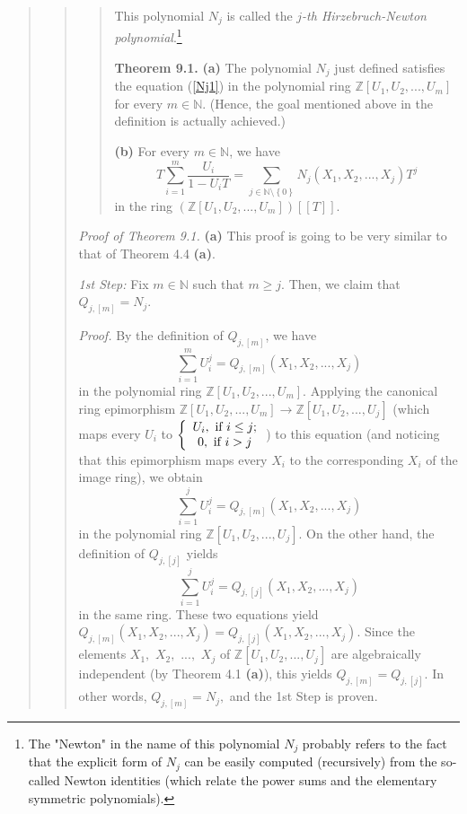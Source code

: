\documentclass[12pt,final,notitlepage,onecolumn,german]{article}%
\begin{document}
\begin{quote}
\begin{quote}
\begin{quote}
This polynomial $N_{j}$ is called the $j$\textit{-th Hirzebruch-Newton
polynomial}.\footnote{The "Newton" in the name of this polynomial $N_{j}$
probably refers to the fact that the explicit form of $N_{j}$ can be easily
computed (recursively) from the so-called Newton identities (which relate the
power sums and the elementary symmetric polynomials).}

\textbf{Theorem 9.1.} \textbf{(a)} The polynomial $N_{j}$ just defined
satisfies the equation (\ref{Nj1}) in the polynomial ring $\mathbb{Z}\left[
U_{1},U_{2},...,U_{m}\right]  $ for every $m\in\mathbb{N}$. (Hence, the goal
mentioned above in the definition is actually achieved.)

\textbf{(b)} For every $m\in\mathbb{N}$, we have%
\begin{equation}
T\sum_{i=1}^{m}\dfrac{U_{i}}{1-U_{i}T}=\sum_{j\in\mathbb{N}\setminus\left\{
0\right\}  }N_{j}\left(  X_{1},X_{2},...,X_{j}\right)  T^{j} \label{Nj2}%
\end{equation}
in the ring $\left(  \mathbb{Z}\left[  U_{1},U_{2},...,U_{m}\right]  \right)
\left[  \left[  T\right]  \right]  $.
\end{quote}

\textit{Proof of Theorem 9.1.} \textbf{(a)} This proof is going to be very
similar to that of Theorem 4.4 \textbf{(a)}.

\textit{1st Step:} Fix $m\in\mathbb{N}$ such that $m\geq j$. Then, we claim
that $Q_{j,\left[  m\right]  }=N_{j}$.

\textit{Proof.} By the definition of $Q_{j,\left[  m\right]  }$, we have%
\[
\sum_{i=1}^{m}U_{i}^{j}=Q_{j,\left[  m\right]  }\left(  X_{1},X_{2}%
,...,X_{j}\right)
\]
in the polynomial ring $\mathbb{Z}\left[  U_{1},U_{2},...,U_{m}\right]  $.
Applying the canonical ring epimorphism $\mathbb{Z}\left[  U_{1}%
,U_{2},...,U_{m}\right]  \rightarrow\mathbb{Z}\left[  U_{1},U_{2}%
,...,U_{j}\right]  $ (which maps every $U_{i}$ to $\left\{
\begin{array}
[c]{c}%
U_{i},\text{ if }i\leq j;\\
0,\text{ if }i>j
\end{array}
\right.  $) to this equation (and noticing that this epimorphism maps every
$X_{i}$ to the corresponding $X_{i}$ of the image ring), we obtain%
\[
\sum_{i=1}^{j}U_{i}^{j}=Q_{j,\left[  m\right]  }\left(  X_{1},X_{2}%
,...,X_{j}\right)
\]
in the polynomial ring $\mathbb{Z}\left[  U_{1},U_{2},...,U_{j}\right]  $. On
the other hand, the definition of $Q_{j,\left[  j\right]  }$ yields%
\[
\sum_{i=1}^{j}U_{i}^{j}=Q_{j,\left[  j\right]  }\left(  X_{1},X_{2}%
,...,X_{j}\right)
\]
in the same ring. These two equations yield $Q_{j,\left[  m\right]  }\left(
X_{1},X_{2},...,X_{j}\right)  =Q_{j,\left[  j\right]  }\left(  X_{1}%
,X_{2},...,X_{j}\right)  $. Since the elements $X_{1},$ $X_{2},$ $...,$
$X_{j}$ of $\mathbb{Z}\left[  U_{1},U_{2},...,U_{j}\right]  $ are
algebraically independent (by Theorem 4.1 \textbf{(a)}), this yields
$Q_{j,\left[  m\right]  }=Q_{j,\left[  j\right]  }.$ In other words,
$Q_{j,\left[  m\right]  }=N_{j},$ and the 1st Step is proven.


\end{quote}
\end{quote}
\end{document}
